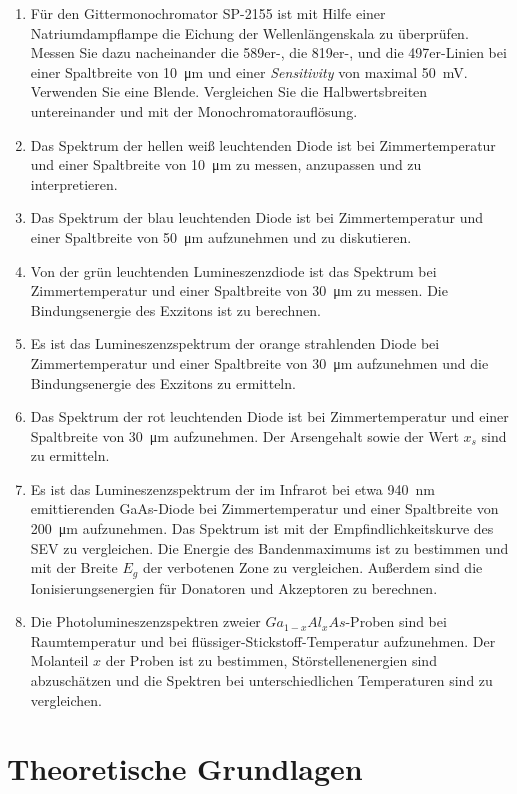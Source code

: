 \documentclass{article}
\begin{document}
\begin{enumerate}
\item Für den Gittermonochromator SP-2155 ist mit Hilfe einer Natriumdampflampe die Eichung der Wellenlängenskala zu überprüfen. Messen Sie dazu nacheinander die 589er-, die 819er-, und die 497er-Linien bei einer Spaltbreite von \SI{10}{\micro\meter} und einer \textit{Sensitivity} von maximal \SI{50}{\milli\volt}. Verwenden Sie eine Blende. Vergleichen Sie die Halbwertsbreiten untereinander und mit der Monochromatorauflösung.
\item Das Spektrum der hellen weiß leuchtenden Diode ist bei Zimmertemperatur und einer Spaltbreite von \SI{10}{\micro\meter} zu messen, anzupassen und zu interpretieren.
\item Das Spektrum der blau leuchtenden Diode ist bei Zimmertemperatur und einer Spaltbreite von \SI{50}{\micro\meter} aufzunehmen und zu diskutieren.
\item Von der grün leuchtenden Lumineszenzdiode ist das Spektrum bei Zimmertemperatur und einer Spaltbreite von \SI{30}{\micro\meter} zu messen. Die Bindungsenergie des Exzitons ist zu berechnen.
\item Es ist das Lumineszenzspektrum der orange strahlenden Diode bei Zimmertemperatur und einer Spaltbreite von \SI{30}{\micro\meter} aufzunehmen und die Bindungsenergie des Exzitons zu ermitteln.
\item Das Spektrum der rot leuchtenden Diode ist bei Zimmertemperatur und einer Spaltbreite von \SI{30}{\micro\meter} aufzunehmen. Der Arsengehalt sowie der Wert $x_s$ sind zu ermitteln.
\item Es ist das Lumineszenzspektrum der im Infrarot bei etwa \SI{940}{\nano\meter} emittierenden GaAs-Diode bei Zimmertemperatur und einer Spaltbreite von \SI{200}{\micro\meter} aufzunehmen. Das Spektrum ist mit der Empfindlichkeitskurve des SEV zu vergleichen. Die Energie des Bandenmaximums ist zu bestimmen und mit der Breite $E_g$ der verbotenen Zone zu vergleichen. Außerdem sind die Ionisierungsenergien für Donatoren und Akzeptoren zu berechnen.
\item Die Photolumineszenzspektren zweier $Ga_{1-x}Al_xAs$-Proben sind bei Raumtemperatur und bei flüssiger-Stickstoff-Temperatur aufzunehmen. Der Molanteil $x$ der Proben ist zu bestimmen, Störstellenenergien sind abzuschätzen und die Spektren bei unterschiedlichen Temperaturen sind zu vergleichen.
\end{enumerate}

\section{Theoretische Grundlagen}
\end{document}
